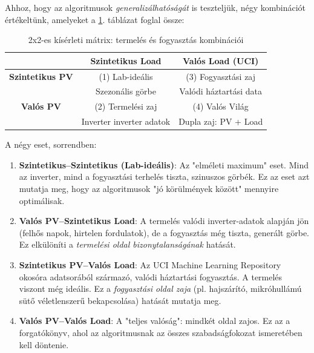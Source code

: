 Ahhoz, hogy az algoritmusok \textit{generalizálhatóságát} is teszteljük, négy kombinációt értékeltünk, amelyeket a \ref{tab:matrix_2x2}. táblázat foglal össze:

\begin{table}[H]
\centering
\caption{2x2-es kísérleti mátrix: termelés és fogyasztás kombinációi}
\label{tab:matrix_2x2}
\begin{tabular}{c|cc}
\hline
\textbf{} & \textbf{Szintetikus Load} & \textbf{Valós Load (UCI)} \\
\hline
\textbf{Szintetikus PV} & (1) Lab-ideális & (3) Fogyasztási zaj \\
& Szezonális görbe & Valódi háztartási data \\
\hline
\textbf{Valós PV} & (2) Termelési zaj & (4) Valós Világ \\
& Inverter inverter adatok & Dupla zaj: PV + Load \\
\hline
\end{tabular}
\end{table}

A négy eset, sorrendben:
\begin{enumerate}
	\item \textbf{Szintetikus–Szintetikus (Lab-ideális)}: Az "elméleti maximum" eset. Mind az inverter, mind a fogyasztási terhelés tiszta, szinuszos görbék. Ez az eset azt mutatja meg, hogy az algoritmusok "jó körülmények között" mennyire optimálisak.
	
	\item \textbf{Valós PV–Szintetikus Load}: A termelés valódi inverter-adatok alapján jön (felhős napok, hirtelen fordulatok), de a fogyasztás még tiszta, generált görbe. Ez elkülöníti a \textit{termelési oldal bizonytalanságának} hatását.
	
	\item \textbf{Szintetikus PV–Valós Load}: Az UCI Machine Learning Repository okosóra adatsorából származó, valódi háztartási fogyasztás. A termelés viszont még ideális. Ez a \textit{fogyasztási oldal zaja} (pl. hajszárító, mikróhullámú sütő véletlenszerű bekapcsolása) hatását mutatja meg.
	
	\item \textbf{Valós PV–Valós Load}: A "teljes valóság": mindkét oldal zajos. Ez az a forgatókönyv, ahol az algoritmusnak az összes szabadságfokozat ismeretében kell döntenie.
\end{enumerate}

